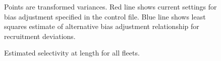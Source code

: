 \documentclass[
]{scrartcl}
\begin{document}
\begin{figure}


\caption{\label{fig-biasadj}Points are transformed variances. Red line
shows current settings for bias adjustment specified in the control
file. Blue line shows least squares estimate of alternative bias
adjustment relationship for recruitment deviations.}

\end{figure}%

\clearpage

\begin{figure}


\caption{\label{fig-selex_allfleets}Estimated selectivity at length for
all fleets.}

\end{figure}%
\end{document}
